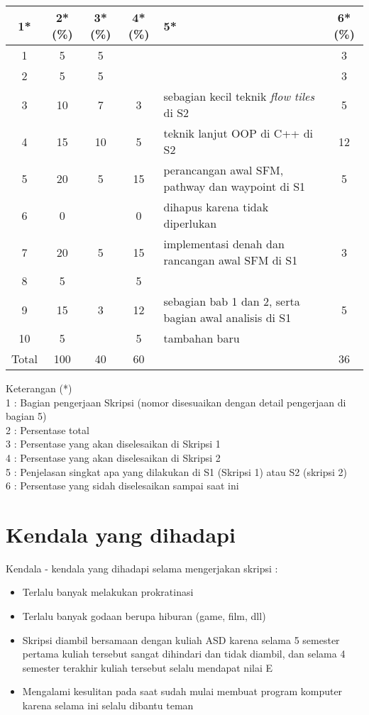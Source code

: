 \documentclass[a4paper,twoside]{article}
\begin{document}
\begin{center}
  \begin{tabular}{ | c | c | c | c | l | c |}
    \hline
    1*  & 2*(\%) & 3*(\%) & 4*(\%) &5* &6*(\%)\\ \hline \hline
    1   & 5  & 5  &  &  & 3 \\ \hline
    2   & 5 & 5  &   &  & 3 \\ \hline
    3   & 10  & 7  & 3 & {\footnotesize sebagian kecil teknik {\it flow tiles} di S2} & 5 \\ \hline
    4   & 15  & 10  &  5 & {\footnotesize teknik lanjut OOP di C++ di S2} & 12 \\ \hline
    5   & 20  & 5  & 15 & {\footnotesize perancangan awal SFM, pathway dan waypoint di S1} & 5 \\ \hline
    6   & 0 &   & 0  &  {\footnotesize dihapus karena tidak diperlukan} & \\\hline
    7   & 20  & 5  & 15 &  {\footnotesize implementasi denah dan rancangan awal SFM di S1} & 3 \\ \hline
    8   & 5  &   &  5  &  &\\ \hline
    9   & 15  & 3  & 12  & {\footnotesize sebagian bab 1 dan 2, serta bagian awal analisis di S1} & 5\\ \hline
    10   & 5  &   & 5  & {\footnotesize tambahan baru} &\\ \hline
    Total  & 100  & 40  & 60 &  & 36\\ \hline
                          \end{tabular}
\end{center}

Keterangan (*)\\
1 : Bagian pengerjaan Skripsi (nomor disesuaikan dengan detail pengerjaan di bagian 5)\\
2 : Persentase total \\
3 : Persentase yang akan diselesaikan di Skripsi 1 \\
4 : Persentase yang akan diselesaikan di Skripsi 2 \\
5 : Penjelasan singkat apa yang dilakukan di S1 (Skripsi 1) atau S2 (skripsi 2)\\
6 : Persentase yang sidah diselesaikan sampai saat ini 

\section{Kendala yang dihadapi}
Kendala - kendala yang dihadapi selama mengerjakan skripsi :
\begin{itemize}
	\item Terlalu banyak melakukan prokratinasi
	\item Terlalu banyak godaan berupa hiburan (game, film, dll)
	\item Skripsi diambil bersamaan dengan kuliah ASD karena selama 5 semester pertama kuliah tersebut sangat dihindari dan tidak diambil, dan selama 4 semester terakhir kuliah tersebut selalu mendapat nilai E
	\item Mengalami kesulitan pada saat sudah mulai membuat program komputer karena selama ini selalu dibantu teman
\end{itemize}
\end{document}
